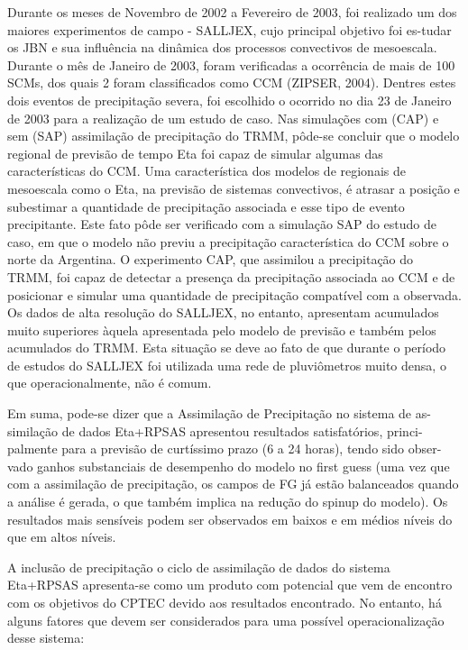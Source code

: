 Durante os meses de Novembro de 2002 a Fevereiro de 2003, foi realizado um dos maiores experimentos de campo - SALLJEX, cujo principal objetivo foi es-tudar os JBN e sua influência na dinâmica dos processos convectivos de mesoescala. Durante o mês de Janeiro de 2003, foram verificadas a ocorrência de mais de 100 SCMs, dos quais 2 foram classificados como CCM (ZIPSER, 2004).  Dentres estes dois eventos de precipitação severa, foi escolhido o ocorrido no dia 23 de Janeiro de 2003 para a realização de um estudo de caso. Nas simulações com (CAP) e sem (SAP) assimilação de precipitação do TRMM, pôde-se concluir que o modelo regional de previsão de tempo Eta foi capaz de simular algumas das características do CCM. Uma característica dos modelos de regionais de mesoescala como o Eta, na previsão de sistemas convectivos, é atrasar a posição e subestimar a quantidade de precipitação associada e esse tipo de evento precipitante. Este fato pôde ser verificado com a simulação SAP do estudo de caso, em que o modelo não previu a precipitação característica do CCM sobre o norte da Argentina. O experimento CAP, que assimilou a precipitação do TRMM, foi capaz de detectar a presença da precipitação associada ao CCM e de posicionar e simular uma quantidade de precipitação compatível com a observada. Os dados de alta resolução do SALLJEX, no entanto, apresentam acumulados muito superiores àquela apresentada pelo modelo de previsão e também pelos acumulados do TRMM. Esta situação se deve ao fato de que durante o período de estudos do SALLJEX foi utilizada uma rede de pluviômetros muito densa, o que operacionalmente, não é comum.

Em suma, pode-se dizer que a Assimilação de Precipitação no sistema de as-similação de dados Eta+RPSAS apresentou resultados satisfatórios, princi-palmente para a previsão de curtíssimo prazo (6 a 24 horas), tendo sido obser-vado ganhos substanciais de desempenho do modelo no first guess (uma vez que com a assimilação de precipitação, os campos de FG já estão balanceados quando a análise é gerada, o que também implica na redução do spinup do modelo). Os resultados mais sensíveis podem ser observados em baixos e em médios níveis do que em altos níveis.

A inclusão de precipitação o ciclo de assimilação de dados do sistema Eta+RPSAS apresenta-se como um produto com potencial que vem de encontro com os objetivos do CPTEC devido aos resultados encontrado. No entanto, há alguns fatores que devem ser considerados para uma possível operacionalização desse sistema:

